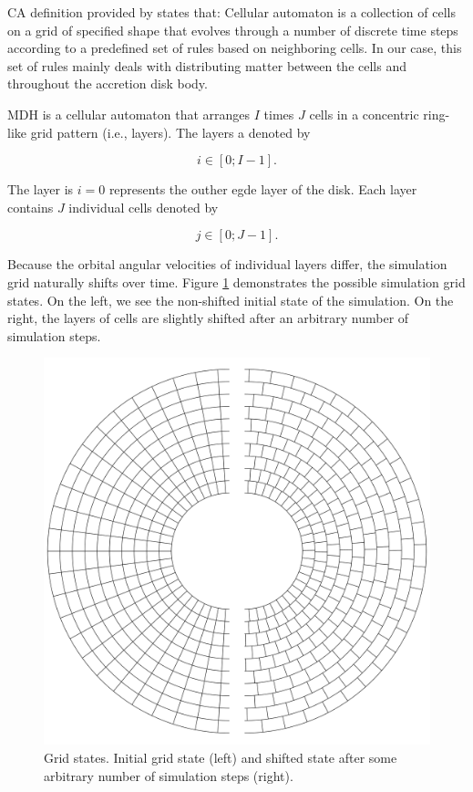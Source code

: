 CA definition provided by \cite{wolfram2002} states that: Cellular automaton is a collection of cells on a grid of specified shape that evolves through a number of discrete time steps according to a predefined set of rules based on neighboring cells. In our case, this set of rules mainly deals with distributing matter between the cells and throughout the accretion disk body.

MDH is a cellular automaton that arranges $I$ times $J$ cells in a concentric ring-like grid pattern (i.e., layers). The layers a denoted by 

\begin{equation}
i \in [0;I-1].
\end{equation}

The layer is $i=0$ represents the outher egde layer of the disk. Each layer contains $J$ individual cells denoted by

\begin{equation}
j \in [0;J-1].
\end{equation}

Because the orbital angular velocities of individual layers differ, the simulation grid naturally shifts over time. Figure \ref{fig:grid_states} demonstrates the possible simulation grid states. On the left, we see the non-shifted initial state of the simulation. On the right, the layers of cells are slightly shifted after an arbitrary number of simulation steps.

\begin{figure}[H]
\centering
\includegraphics[width=\columnwidth]{img/grid_states.pdf}
\caption{Grid states. Initial grid state (left) and shifted state after some arbitrary number of simulation steps (right).}
\label{fig:grid_states}
\end{figure}

